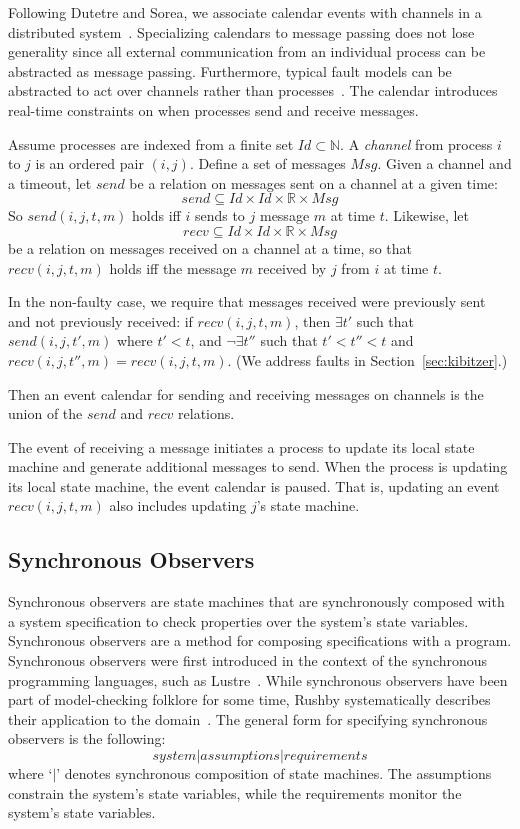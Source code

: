 \documentclass{IEEEtran/IEEEtran}
\newcommand{\lee}[1]{ } %
\newcommand{\lee}[1]{ {\color{blue}$<$lee: #1$>$} } %
\begin{document}
Following Dutetre and Sorea, we associate calendar events with channels in a distributed system~\cite{dutetre}. Specializing calendars to message passing does not lose generality since all external communication from an individual process can be abstracted as message passing. Furthermore, typical fault models can be abstracted to act over channels rather than processes~\cite{abstractions}. The calendar introduces real-time constraints on when processes send and receive messages.

Assume processes are indexed from a finite set $Id \subset \mathbb{N}$. A \emph{channel} from process $i$ to $j$ is an ordered pair $(i,j)$. Define a set of messages $Msg$. Given a channel and a timeout, let $send$ be a relation on messages sent on a channel at a given time:
$$send \subseteq Id \times Id \times \mathbb{R} \times Msg$$
So $send(i, j, t, m)$ holds iff $i$ sends to $j$ message $m$ at time $t$. Likewise, let
$$recv \subseteq Id \times Id \times \mathbb{R} \times Msg$$
be a relation on messages received on a channel at a time, so that $recv(i, j, t, m)$ holds iff the message $m$ received by $j$ from $i$ at time $t$.

In the non-faulty case, we require that messages received were previously sent and not previously received: if $recv(i, j, t, m)$, then $\exists t'$ such that $send(i, j, t', m)$ where $t' < t$, and $\neg\exists t''$ such that $t' < t'' < t$ and $recv(i, j, t'', m) = recv(i, j, t, m)$. (We address faults in Section~\ref{sec:kibitzer}.)

Then an event calendar for sending and receiving messages on channels is the union of the $send$ and $recv$ relations.

\lee{technically, atomic time is just a convenience.}
The event of receiving a message initiates a process to update its local state machine and generate additional messages to send. When the process is updating its local state machine, the event calendar is paused. That is, updating an event $recv(i, j, t, m)$ also includes updating $j$'s state machine.

\lee{note that we don't need full generality of send and receive events in OM(1)}

\subsection{Synchronous Observers}\label{sec:sync}
Synchronous observers are state machines that are synchronously composed with a system specification to check properties over the system's state variables. Synchronous observers are a method for composing specifications with a program. Synchronous observers were first introduced in the context of the synchronous programming languages, such as Lustre~\cite{}. While synchronous observers have been part of model-checking folklore for some time, Rushby systematically describes their application to the domain~\cite{}. The general form for specifying synchronous observers is the following:
$$system | assumptions | requirements$$
\noindent
where `$|$' denotes synchronous composition of state machines. The assumptions constrain the system's state variables, while the requirements monitor the system's state variables. 
\end{document}
